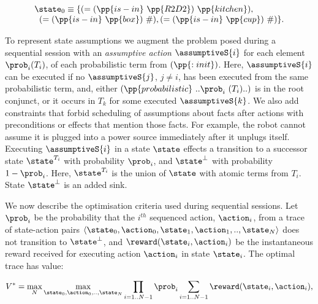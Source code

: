 \vspace{-1ex}

\small
\[
\begin{array}{l}
\state_0 \equiv \{(=(\pp{is-in}~\pp{R2D2})~\pp{kitchen}),\\
\;\;(=(\pp{is-in}~\pp{box})~\#), (=(\pp{is-in}~\pp{cup})~\#)\}.
\end{array}
\]
\normalsize

\vspace{-1ex}

To represent state assumptions we augment the problem posed during
a sequential session with an \emph{assumptive action} $\assumptiveS{i}$ for
each element $\prob_i (T_i)$, of each probabilistic term from
$(\pp{:init})$. Here, $\assumptiveS{i}$ can be executed if no
$\assumptiveS{j}$, $j \neq i$, has been executed from the same
probabilistic term, and, either
$(\pp{probabilistic}~..\prob_i~(T_i)..)$ is in the root conjunct, or
it occurs in $T_k$ for some executed $\assumptiveS{k}$.
We also add constraints that forbid scheduling of
assumptions about facts after actions with preconditions or effects
that mention those facts. For example, the robot cannot assume it is
plugged into a power source immediately after it unplugs itself.
Executing $\assumptiveS{i}$ in a state $\state$ effects a transition
to a successor state $\state^{T_i}$ with probability $\prob_i$, and
$\state^\bot$ with probability $1 - \prob_i$. Here, $\state^{T_i}$ is
the union of $\state$ with atomic terms from $T_i$. State
$\state^\bot$ is an added sink.


We now describe the optimisation criteria used during sequential
sessions. Let $\prob_i$ be the probability that the $i^{th}$ sequenced
action, $\action_i$, from a trace of state-action pairs
$\langle \state_0, \action_0,\state_1, \action_1,.., \state_N \rangle$
does not transition to $\state^\bot$, and
$\reward(\state_i, \action_i)$ be the instantaneous reward received
for executing action $\action_i$ in state $\state_i$. The optimal
trace has value:


\small
\[
V^* = \max_N \max_{\state_0, \action_0,.., \state_N} \prod_{i=1..N-1} \prob_i \sum_{i=1..N-1}
\reward(\state_i, \action_i),
\]
\normalsize

